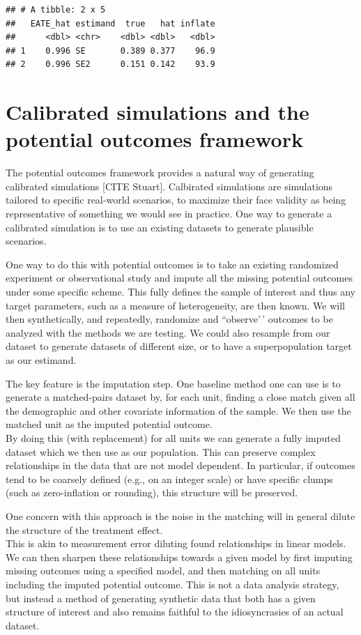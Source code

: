 \documentclass[
]{book}
\begin{document}
\begin{verbatim}
## # A tibble: 2 x 5
##   EATE_hat estimand  true   hat inflate
##      <dbl> <chr>    <dbl> <dbl>   <dbl>
## 1    0.996 SE       0.389 0.377    96.9
## 2    0.996 SE2      0.151 0.142    93.9
\end{verbatim}

\hypertarget{calibrated-simulations-and-the-potential-outcomes-framework}{%
\section{Calibrated simulations and the potential outcomes framework}\label{calibrated-simulations-and-the-potential-outcomes-framework}}

The potential outcomes framework provides a natural way of generating calibrated simulations {[}CITE Stuart{]}.
Calbirated simulations are simulations tailored to specific real-world scenarios, to maximize their face validity as being representative of something we would see in practice.
One way to generate a calibrated simulation is to use an existing datasets to generate plausible scenarios.

One way to do this with potential outcomes is to take an existing randomized experiment or observational study and impute all the missing potential outcomes under some specific scheme.
This fully defines the sample of interest and thus any target parameters, such as a measure of heterogeneity, are then known.
We will then synthetically, and repeatedly, randomize and ``observe'\,' outcomes to be analyzed with the methods we are testing.
We could also resample from our dataset to generate datasets of different size, or to have a superpopulation target as our estimand.

The key feature is the imputation step.
One baseline method one can use is to generate a matched-pairs dataset by, for each unit, finding a close match given all the demographic and other covariate information of the sample. We then use the matched unit as the imputed potential outcome.\\
By doing this (with replacement) for all units we can generate a fully imputed dataset which we then use as our population.
This can preserve complex relationships in the data that are not model dependent.
In particular, if outcomes tend to be coarsely defined (e.g., on an integer scale) or have specific clumps (such as zero-inflation or rounding), this structure will be preserved.

One concern with this approach is the noise in the matching will in general dilute the structure of the treatment effect.\\
This is akin to measurement error diluting found relationships in linear models.
We can then sharpen these relationships towards a given model by first imputing missing outcomes using a specified model, and then matching on all units including the imputed potential outcome.
This is not a data analysis strategy, but instead a method of generating synthetic data that both has a given structure of interest and also remains faithful to the idiosyncrasies of an actual dataset.
\end{document}
